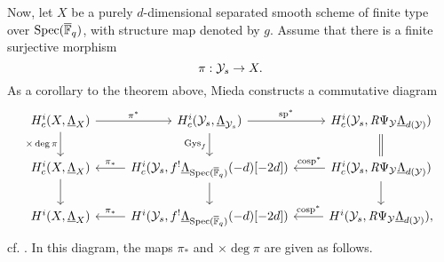\documentclass[../main.tex]{subfiles}
\begin{document}
Now, let $X$ be a purely $d$-dimensional separated smooth scheme of finite type
over $\operatorname{Spec}({\overline {\mathbb{F}}_q})$, with structure map denoted by $g$. Assume that there is a
finite surjective morphism
\begin{equation*}
  \pi: \mathcal{Y}_s \to X.
\end{equation*}
As a corollary to the theorem above, Mieda constructs a commutative diagram
\begin{equation}\label{eq:MiedasCommutingDiagram}
\begin{tikzcd}[ampersand replacement=\&]
  {\hH_c^i(X, \underline \Lambda_X)} \& {\hH^i_c(\cY_s, \underline
  \Lambda_{\cY_s})} \& {\hH^i_c(\cY_s, \derR \Psi_\cY \underline
    \Lambda_{d(\cY)})} \\
  {\hH^i_c(X, \underline \Lambda_{X})} \& {\hH^i_c(\cY_s, f^! \underline
  \Lambda_{\spec(\Fqbar)}(-d)[-2d])} \& {\hH^i_c(\cY_s, \derR \Psi_\cY
  \underline \Lambda_{d(\cY)})} \\
  {\hH^i(X, \underline \Lambda_{X})} \& {\hH^i(\cY_s, f^! \underline
  \Lambda_{\spec(\Fqbar)}(-d)[-2d])} \& {\hH^i(\cY_s, \derR \Psi_\cY \underline
  \Lambda_{d(\cY)}),}
	\arrow["{\pi^*}", from=1-1, to=1-2]
	\arrow["{\times \deg\pi}"', from=1-1, to=2-1]
	\arrow["{\specmap^*}", from=1-2, to=1-3]
	\arrow["{\Gys_f}"', from=1-2, to=2-2]
	\arrow[Rightarrow, no head, from=1-3, to=2-3]
	\arrow[from=2-1, to=3-1]
	\arrow["{\pi_*}"', from=2-2, to=2-1]
	\arrow[from=2-2, to=3-2]
	\arrow["{\cospecmap^*}"', from=2-3, to=2-2]
	\arrow[from=2-3, to=3-3]
	\arrow["{\pi_*}"', from=3-2, to=3-1]
	\arrow["{\cospecmap^*}"', from=3-3, to=3-2]
\end{tikzcd}
\end{equation}
cf. \cite[Corollary 2.7]{mieda2016geometric}.
In this diagram, the maps $\pi_*$ and $\times \deg \pi$ are given as follows.
\end{document}

